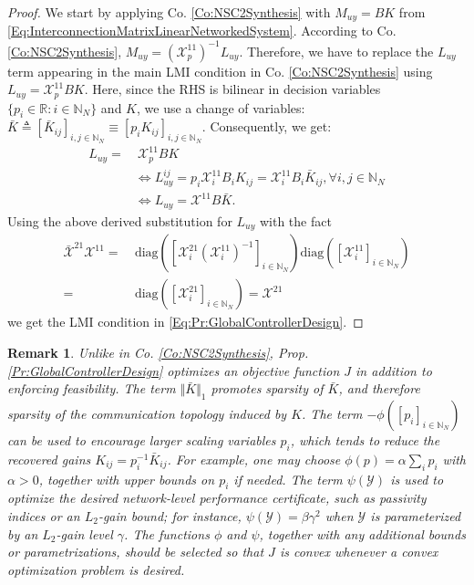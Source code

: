 \documentclass[letterpaper, 10 pt, conference]{ieeeconf}%
\newcommand{\R}{\mathbb{R}}
\newcommand{\N}{\mathbb{N}}
\newcommand{\0}{\mathbf{0}}
\newcommand{\X}{\mathcal{X}}
\newcommand{\Y}{\mathcal{Y}}
\newcommand{\diag}{\text{diag}}
\newtheorem{remark}{\textbf{Remark}}
\begin{document}
\begin{proof}
We start by applying Co. \ref{Co:NSC2Synthesis} with $M_{uy} = BK$ from \eqref{Eq:InterconnectionMatrixLinearNetworkedSystem}. According to Co. \ref{Co:NSC2Synthesis}, $M_{uy} = (\X_p^{11})^{-1} L_{uy}$. Therefore, we have to replace the $L_{uy}$ term appearing in the main LMI condition in Co. \ref{Co:NSC2Synthesis} using $L_{uy} = \X_p^{11} BK$. Here, since the RHS is bilinear in decision variables $\{p_i\in\R: i\in\N_N\}$ and $K$, we use a change of variables: $\bar{K} \triangleq [\bar{K}_{ij}]_{i,j\in\N_N} \equiv [p_i K_{ij}]_{i,j\in\N_N}$. Consequently, we get: 
\begin{equation*}
\begin{aligned}
L_{uy} =&\ \X_p^{11} B K \\
&\iff L_{uy}^{ij} = p_i \X_i^{11} B_i K_{ij} = \X_i^{11} B_i \bar{K}_{ij}, \forall i,j \in \N_N \\ 
&\iff L_{uy} = \X^{11} B \bar{K}.        
\end{aligned}
\end{equation*}
Using the above derived substitution for $L_{uy}$ with the fact 
\begin{equation*}
\begin{aligned}
\bar{\X}^{21}\X^{11} =&\ \diag([\X_i^{21}(\X_i^{11})^{-1}]_{i\in\N_N}) \diag([\X_i^{11}]_{i\in\N_N})\\
=&\ \diag([\X_i^{21}]_{i\in\N_N}) = \X^{21}
\end{aligned}
\end{equation*}
we get the LMI condition in \eqref{Eq:Pr:GlobalControllerDesign}.  
\end{proof}

\begin{remark}\label{Rm:GlobalObjective}
Unlike in Co. \ref{Co:NSC2Synthesis}, Prop. \ref{Pr:GlobalControllerDesign} optimizes an objective function $J$ in addition to enforcing feasibility. The term $\Vert \bar K\Vert_1$ promotes sparsity of $\bar K$, and therefore sparsity of the communication topology induced by $K$. The term $-\phi([p_i]_{i\in\N_N})$ can be used to encourage larger scaling variables $p_i$, which tends to reduce the recovered gains $K_{ij}=p_i^{-1}\bar K_{ij}$. For example, one may choose $\phi(p)=\alpha\sum_i p_i$ with $\alpha>0$, together with upper bounds on $p_i$ if needed. The term $\psi(\Y)$ is used to optimize the desired network-level performance certificate, such as passivity indices or an $L_2$-gain bound; for instance, $\psi(\Y)=\beta\gamma^2$ when $\Y$ is parameterized by an $L_2$-gain level $\gamma$. The functions $\phi$ and $\psi$, together with any additional bounds or parametrizations, should be selected so that $J$ is convex whenever a convex optimization problem is desired.
\end{remark}
\end{document}
